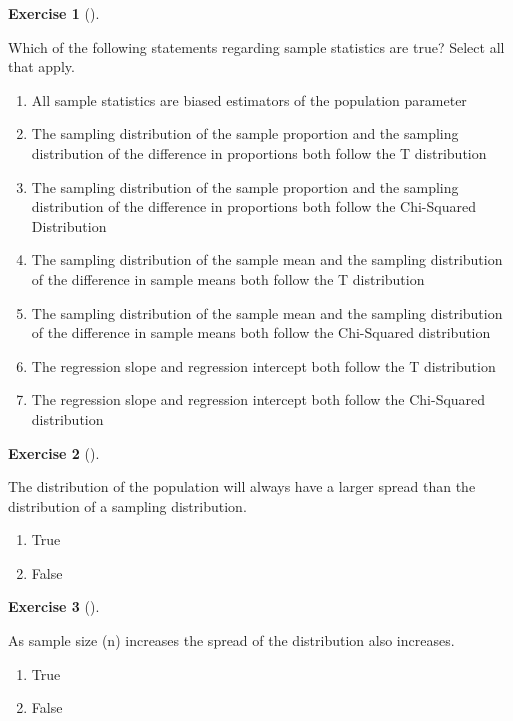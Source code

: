 \documentclass[
  letterpaper,
  DIV=11,
  numbers=noendperiod]{scrreprt}
\providecommand{\tightlist}{%
  \setlength{\itemsep}{0pt}\setlength{\parskip}{0pt}}\usepackage{longtable,booktabs,array}
\theoremstyle{definition}
\newtheorem{exercise}{Exercise}[chapter]
\theoremstyle{remark}
\begin{document}
\begin{exercise}[]\protect\hypertarget{exr-ch09-c07}{}\label{exr-ch09-c07}

Which of the following statements regarding sample statistics are true?
Select all that apply.

\begin{enumerate}
\def\labelenumi{\alph{enumi})}
\tightlist
\item
  All sample statistics are biased estimators of the population
  parameter
\item
  The sampling distribution of the sample proportion and the sampling
  distribution of the difference in proportions both follow the T
  distribution
\item
  The sampling distribution of the sample proportion and the sampling
  distribution of the difference in proportions both follow the
  Chi-Squared Distribution
\item
  The sampling distribution of the sample mean and the sampling
  distribution of the difference in sample means both follow the T
  distribution
\item
  The sampling distribution of the sample mean and the sampling
  distribution of the difference in sample means both follow the
  Chi-Squared distribution
\item
  The regression slope and regression intercept both follow the T
  distribution
\item
  The regression slope and regression intercept both follow the
  Chi-Squared distribution
\end{enumerate}

\end{exercise}

\begin{exercise}[]\protect\hypertarget{exr-ch09-c08}{}\label{exr-ch09-c08}

The distribution of the population will always have a larger spread than
the distribution of a sampling distribution.

\begin{enumerate}
\def\labelenumi{\alph{enumi})}
\tightlist
\item
  True
\item
  False
\end{enumerate}

\end{exercise}

\begin{exercise}[]\protect\hypertarget{exr-ch09-c09}{}\label{exr-ch09-c09}

As sample size (n) increases the spread of the distribution also
increases.

\begin{enumerate}
\def\labelenumi{\alph{enumi})}
\tightlist
\item
  True
\item
  False
\end{enumerate}

\end{exercise}
\end{document}
